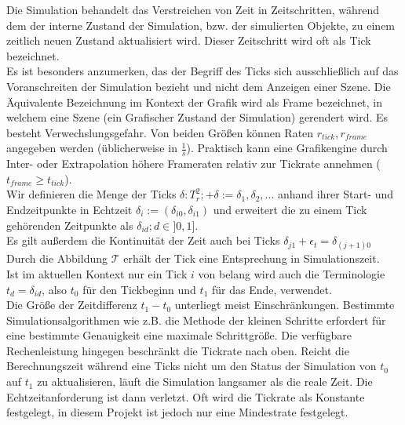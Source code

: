
Die Simulation behandelt das Verstreichen von Zeit in Zeitschritten, während dem der interne Zustand der Simulation, bzw. der simulierten Objekte, zu einem zeitlich neuen Zustand aktualisiert wird.
Dieser Zeitschritt wird oft als Tick bezeichnet.\\
Es ist besonders anzumerken, das der Begriff des Ticks sich ausschließlich auf das Voranschreiten der Simulation bezieht und nicht dem Anzeigen einer Szene. Die Äquivalente Bezeichnung im Kontext der Grafik wird als Frame bezeichnet, in welchem eine Szene (ein Grafischer Zustand der Simulation) gerendert wird. Es besteht Verwechslungsgefahr. Von beiden Größen können Raten $r_{tick}, r_{frame}$ angegeben werden (üblicherweise in $\frac{1}{s}$). Praktisch kann eine Grafikengine durch Inter- oder Extrapolation höhere Frameraten relativ zur Tickrate annehmen ($t_{frame}\geq t_{tick}$).\\
Wir definieren die Menge der Ticks $\delta:T_r^2; +\delta:={\delta_1, \delta_2, ...}$ anhand ihrer Start- und Endzeitpunkte in Echtzeit $\delta_i := (\delta_{i0}, \delta_{i1})$ und erweitert die zu einem Tick gehörenden Zeitpunkte als $\delta_{id}; d \in ]0,1]$.\\
Es gilt außerdem die Kontinuität der Zeit auch bei Ticks $\delta_{j1} + \epsilon_t = \delta_{(j+1)0}$\\
Durch die Abbildung $\mathcal{T}$ erhält der Tick eine Entsprechung in Simulationszeit.\\
Ist im aktuellen Kontext nur ein Tick $i$ von belang wird auch die Terminologie $t_d = \delta_{id}$, also $t_0$ für den Tickbeginn und $t_1$ für das Ende, verwendet.\\
Die Größe der Zeitdifferenz $t_1 - t_0$ unterliegt meist Einschränkungen. Bestimmte Simulationsalgorithmen wie z.B. die Methode der kleinen Schritte erfordert für eine bestimmte Genauigkeit eine maximale Schrittgröße. Die verfügbare Rechenleistung hingegen beschränkt die Tickrate nach oben. Reicht die Berechnungszeit während eine Ticks nicht um den Status der Simulation von $t_0$ auf $t_1$ zu aktualisieren, läuft die Simulation langsamer als die reale Zeit. Die Echtzeitanforderung ist dann verletzt. Oft wird die Tickrate als Konstante festgelegt, in diesem Projekt ist jedoch nur eine Mindestrate festgelegt.

